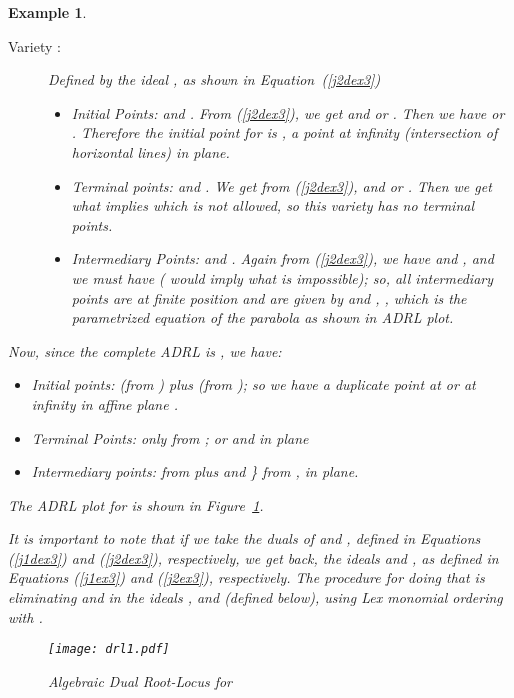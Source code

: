 \documentclass{article}
\newtheorem{example}{Example}[section]
\begin{document}
\begin{example}
\begin{description}
\begin{itemize}
\end{itemize}

\item[Variety :] Defined by the ideal , as shown in Equation~(\ref{j2dex3})
\begin{itemize}
\item Initial Points:  and . From (\ref{j2dex3}), we get  and  or . Then we 
have 
or . Therefore the initial point for  is , a point at infinity (intersection of horizontal 
lines) in  plane.
\item Terminal points:  and . We get from (\ref{j2dex3}),  and  or 
. Then we get  what implies  which is not allowed, so this variety has no terminal points.
\item Intermediary Points:  and . Again from (\ref{j2dex3}), we have  and 
, and we must have  ( would imply  what is impossible); so, all intermediary 
points are at finite position and are given by  and , , which is the 
parametrized equation of the parabola as shown in ADRL plot.

\end{itemize}

\end{description}

Now, since the complete ADRL is , we have:
\begin{itemize}
\item Initial points:  (from ) plus  (from ); so we have a duplicate 
point at  or at infinity in affine plane .
\item Terminal Points:  only from ; or  and  in  plane 
\item Intermediary points:  from 
 plus  and \} from , in
 plane.
\end{itemize}
The ADRL plot for  is shown in Figure~\ref{darlex3}. 

It is important to note that if we take the duals of  and , defined in Equations (\ref{j1dex3}) and 
(\ref{j2dex3}), respectively, we get back, the ideals  and , as defined in Equations (\ref{j1ex3}) and 
(\ref{j2ex3}), respectively. The procedure for doing that is eliminating  and  in the ideals , 
 and  (defined below), using Lex monomial ordering with .




\begin{figure}
\begin{center}
\texttt{[image: drl1.pdf]} 
\caption{\label{darlex3} Algebraic Dual Root-Locus for } 
\end{center}
\end{figure} 



\end{example}
\end{document}

